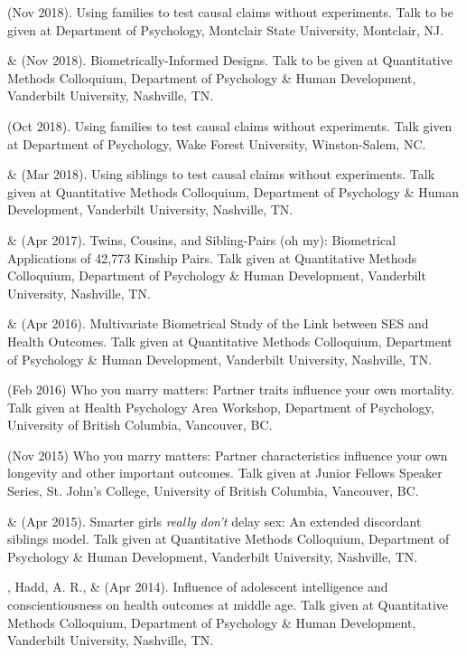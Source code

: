 \item\meb (Nov 2018). Using families to test causal claims without experiments. Talk to be given at Department of Psychology, Montclair State University, Montclair, NJ. 
\item\meb \& \Joe (Nov 2018). Biometrically-Informed Designs. Talk to be given at Quantitative Methods Colloquium, Department of Psychology \& Human Development, Vanderbilt University, Nashville, TN. 
\item\meb (Oct 2018). Using families to test causal claims without experiments. Talk given at Department of Psychology, Wake Forest University, Winston-Salem, NC. 
\item\meb \& \Joe (Mar 2018). Using siblings to test causal claims without experiments. Talk given at Quantitative Methods Colloquium, Department of Psychology \& Human Development, Vanderbilt University, Nashville, TN. 
\item\meb \& \Joe (Apr 2017). Twins, Cousins, and Sibling-Pairs (oh my): Biometrical Applications of 42,773 Kinship Pairs. Talk given at Quantitative Methods Colloquium, Department of Psychology \& Human Development, Vanderbilt University, Nashville, TN. \href{https://osf.io/uyqwd/}{\color{blue}{https://osf.io/uyqwd/}}
\item\meb \& \Joe (Apr 2016). Multivariate Biometrical Study of the Link between SES and Health Outcomes. Talk given at Quantitative Methods Colloquium, Department of Psychology \& Human Development, Vanderbilt University, Nashville, TN.
\item \meb (Feb 2016) Who you marry matters: Partner traits influence your own mortality. Talk given at Health Psychology Area Workshop, Department of Psychology, University of British Columbia, Vancouver, BC. \href{https://osf.io/jbf96/}{\color{blue}{https://osf.io/jbf96/}}
\item \meb (Nov 2015) Who you marry matters: Partner characteristics influence your own longevity and other important outcomes. Talk given at Junior Fellows Speaker Series, St. John's College, University of British Columbia, Vancouver, BC. \href{https://osf.io/zqv5t/}{\color{blue}{https://osf.io/zqv5t/}}
\item\meb \& \Joe (Apr 2015). Smarter girls \textit{really don't} delay sex: An extended discordant siblings model. Talk given at Quantitative Methods Colloquium, Department of Psychology \& Human Development, Vanderbilt University, Nashville, TN.
\item\meb, Hadd, A. R., \& \Joe (Apr 2014). Influence of adolescent intelligence and conscientiousness on health outcomes at middle age. Talk given at Quantitative Methods Colloquium, Department of Psychology \& Human Development, Vanderbilt University, Nashville, TN. 

